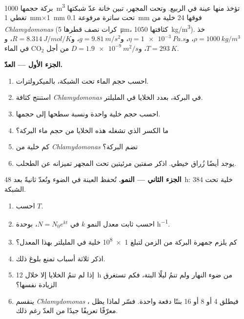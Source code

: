 \begin{problem}
\label{pb:b2:unicellular-diversity:1}
بركة حجمها \qty{1000}{m^3} تؤخذ منها عينة في الربيع. وتحت المجهر،
تبين خانة عدّ شبكتها تغطي \qty{1}{mm}$\times$\qty{1}{mm} تحت
ساترة مرفوعة \qty{0.1}{mm} فوقها 24 خلية من
\emph{Chlamydomonas} (كرات نصف قطرها \qty{5}{\micro m}،
كثافتها \qty{1050}{kg/m^3}). خذ $\rho = \qty{1000}{kg/m^3}$،
و$\eta = \qty{1e-3}{Pa.s}$، و$g = \qty{9.81}{m/s^2}$، و$R =
\qty{8.314}{J/mol/K}$، و$T = \qty{293}{K}$، و$D = \qty{1.9e-9}{m^2/s}$
من أجل $\mathrm{CO_2}$ في الماء.

\medskip
\noindent\textbf{الجزء الأول --- العدّ.}
\begin{enumerate}
  \item احسب حجم الماء تحت الشبكة، بالميكرولترات.
  \item استنتج كثافة \emph{Chlamydomonas} في البركة، بعدد الخلايا
        في المليلتر.
  \item احسب حجم خلية واحدة ونسبة سطحها إلى حجمها.
  \item ما الكسر الذي تشغله هذه الخلايا من حجم ماء البركة؟
  \item كم خلية من \emph{Chlamydomonas} تضم البركة؟
  \item يوجد أيضًا زُراق خيطي. اذكر صفتين مرئيتين تحت المجهر
        تميزانه عن الطحلب.
\end{enumerate}

\medskip
\noindent\textbf{الجزء الثاني --- النمو.}
تُحفظ العينة في الضوء وتُعدّ ثانيةً بعد \qty{48}{h}:
\num{384} خلية تحت الشبكة.
\begin{enumerate}[resume]
  \item احسب  $T$.
  \item احسب ثابت معدل النمو $k$ في $N = N_0 e^{kt}$، بوحدة
        \unit{h^{-1}}.
  \item كم يلزم جمهرة البركة من الزمن لتبلغ \qty{1e8}{} خلية في
        المليلتر بهذا المعدل؟
  \item اذكر ثلاثة أسباب تمنع بلوغ ذلك.
  \item إذا لم تنمُ الخلايا إلا خلال \qty{12}{h} من ضوء النهار ولم
        تنمُ ليلًا البتة، فكم تستغرق الزيادة نفسها؟
  \item ينقسم \emph{Chlamydomonas} ، فيطلق 4 أو 8
        أو 16 بنتًا دفعة واحدة. فسّر لماذا يظل  معرّفًا
        تعريفًا جيدًا من العدّ رغم ذلك.
\end{enumerate}


\end{problem}
